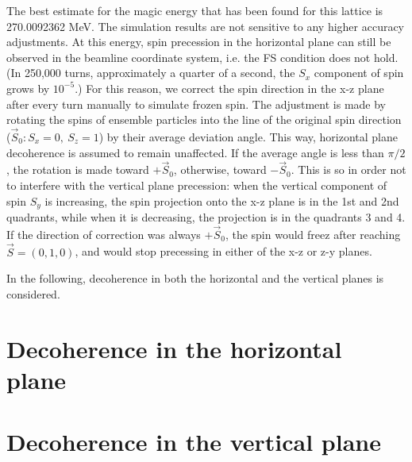\documentclass{article}
\begin{document}
The best estimate for the magic energy that has been found for this lattice is 270.0092362 MeV. The simulation results are not sensitive to any higher accuracy adjustments. At this energy, spin precession in the horizontal plane can still be observed in the beamline coordinate system, i.e. the FS condition does not hold. (In 250,000 turns, approximately a quarter of a second, the $S_x$ component of spin grows by $10^{-5}$.) For this reason, we correct the spin direction in the x-z plane after every turn manually to simulate frozen spin. The adjustment is made by rotating the spins of ensemble particles into the line of the original spin direction ($\vec S_0: S_x = 0,~ S_z = 1$) by their average deviation angle. This way, horizontal plane decoherence is assumed to remain unaffected. If the average angle is less than $\pi/2$, the rotation is made toward $+\vec S_0$, otherwise, toward $-\vec S_0$. This is so in order not to interfere with the vertical plane precession: when the vertical component of spin $S_y$ is increasing, the spin projection onto the x-z plane is in the 1st and 2nd quadrants, while when it is decreasing, the projection is in the quadrants 3 and 4. If the direction of correction was always $+\vec S_0$, the spin would freez after reaching $\vec S = (0, 1, 0)$, and would stop precessing in either of the x-z or z-y planes.

In the following, decoherence in both the horizontal and the vertical planes is considered.

\section{Decoherence in the horizontal plane}

\section{Decoherence in the vertical plane}
\end{document}
